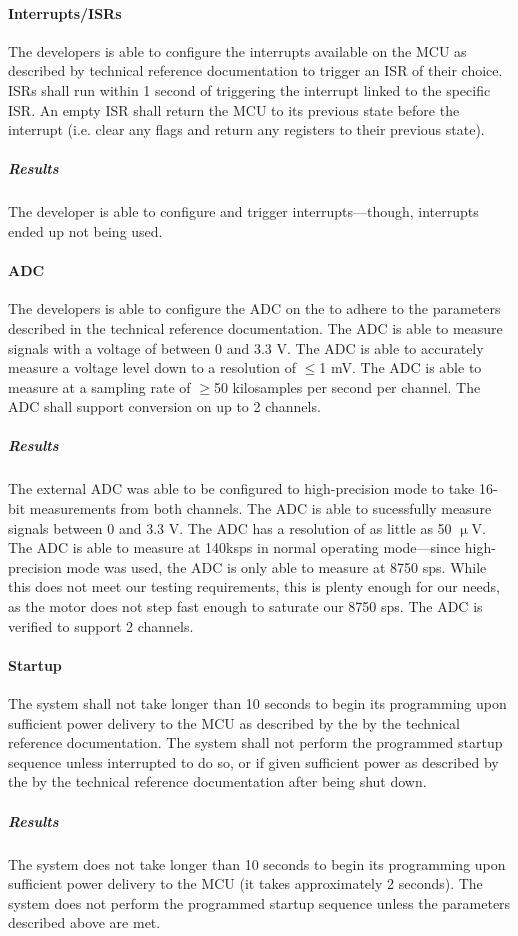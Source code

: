 \paragraph{Interrupts/ISRs} The developers is able to configure
the interrupts available on the MCU as described by technical reference
documentation to trigger an ISR of their choice. ISRs shall run within 1 second
of triggering the interrupt linked to the specific ISR. An empty ISR shall
return the MCU to its previous state before the interrupt (i.e. clear any
flags and return any registers to their previous state).
\subparagraph{Results} The developer is able to configure and trigger interrupts---though, interrupts ended up not being used.

\paragraph{ADC} The developers is able to configure the ADC on the to adhere to the parameters described in the technical reference documentation.
The ADC is able to measure signals with a voltage of between 0 and 3.3 V.
The ADC is able to accurately measure a voltage level down to a
resolution of $\leq$1 mV. The ADC is able to measure at a sampling rate
of $\geq$50 kilosamples per second per channel. The ADC shall support
conversion on up to 2 channels. 
\subparagraph{Results} The external ADC was able to be configured to high-precision mode to take 16-bit measurements from both channels. The ADC is able to sucessfully measure signals between 0 and 3.3 V. The ADC has a resolution of as little as 50 $\upmu$V. The ADC is able to measure at 140ksps in normal operating mode---since high-precision mode was used, the ADC is only able to measure at 8750 sps. While this does not meet our testing requirements, this is plenty enough for our needs, as the motor does not step fast enough to saturate our 8750 sps. The ADC is verified to support 2 channels.

\paragraph{Startup} The system shall not take longer than 10 seconds to begin
its programming upon sufficient power delivery to the MCU as described by
the by the technical reference documentation. The system shall not perform
the programmed startup sequence unless interrupted to do so, or if given
sufficient power as described by the by the technical reference documentation
after being shut down.
\subparagraph{Results} The system does not take longer than 10 seconds to begin
its programming upon sufficient power delivery to the MCU (it takes approximately 2 seconds). The system does not perform
the programmed startup sequence unless the parameters described above are met.

